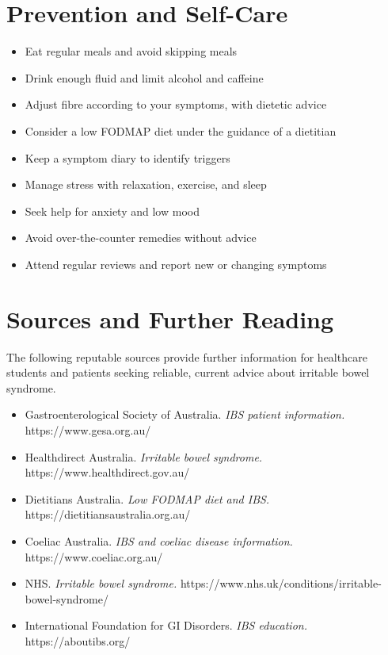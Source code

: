\section*{Prevention and Self-Care}
\begin{itemize}
    \item Eat regular meals and avoid skipping meals
    \item Drink enough fluid and limit alcohol and caffeine
    \item Adjust fibre according to your symptoms, with dietetic advice
    \item Consider a low FODMAP diet under the guidance of a dietitian
    \item Keep a symptom diary to identify triggers
    \item Manage stress with relaxation, exercise, and sleep
    \item Seek help for anxiety and low mood
    \item Avoid over-the-counter remedies without advice
    \item Attend regular reviews and report new or changing symptoms
\end{itemize}

\section*{Sources and Further Reading}
The following reputable sources provide further information for healthcare students and patients seeking reliable, current advice about irritable bowel syndrome.
\begin{itemize}
    \item Gastroenterological Society of Australia. \textit{IBS patient information.} https://www.gesa.org.au/
    \item Healthdirect Australia. \textit{Irritable bowel syndrome.} https://www.healthdirect.gov.au/
    \item Dietitians Australia. \textit{Low FODMAP diet and IBS.} https://dietitiansaustralia.org.au/
    \item Coeliac Australia. \textit{IBS and coeliac disease information.} https://www.coeliac.org.au/
    \item NHS. \textit{Irritable bowel syndrome.} https://www.nhs.uk/conditions/irritable-bowel-syndrome/
    \item International Foundation for GI Disorders. \textit{IBS education.} https://aboutibs.org/
\end{itemize}
